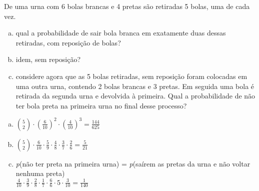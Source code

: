 \begin{ex}
 De uma urna com 6 bolas brancas e 4 pretas são retiradas 5 bolas, uma de cada vez.
    \begin{enumerate}[(a)]
    \item qual a probabilidade de sair bola branca em exatamente duas dessas retiradas, com reposição de bolas?
    \item idem, sem reposição?
    \item considere agora que as 5 bolas retiradas, sem reposição  foram colocadas em uma outra urna, contendo 2 bolas brancas e 3 pretas. Em seguida uma bola é retirada da segunda urna e devolvida à primeira. Qual a probabilidade de não ter bola preta na primeira urna no final desse processo?
    \end{enumerate}
       \begin{sol}
          \phantom{A}  
         \begin{enumerate} [(a)]
             \item $\binom{5}{2}\cdot(\frac{6}{10})^2\cdot(\frac{4}{10})^3=\frac{144}{625}$
             \item $\binom{5}{2}\cdot\frac{6}{10}\cdot\frac{5}{9}\cdot\frac{4}{8}\cdot\frac{3}{7}\cdot\frac{2}{6}=\frac{5}{21}$
             \item \textit{p}(não ter preta na primeira urna) = \textit{p}(saírem as pretas da urna e não voltar nenhuma preta)\\
             $\frac{4}{10}\cdot\frac{3}{9}\cdot\frac{2}{8}\cdot\frac{1}{7}\cdot\frac{6}{6}\cdot5\cdot\frac{3}{10}=\frac{1}{140}$
         \end{enumerate}
       \end{sol}


\end{ex}